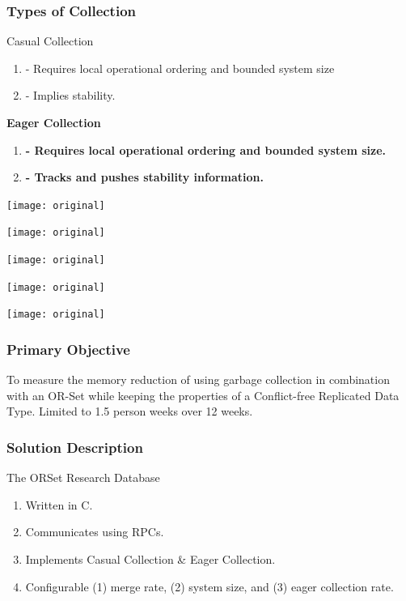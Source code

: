 \documentclass{beamer}
\begin{document}
    \begin{frame}
        \frametitle{Types of Collection}
        Casual Collection
        \begin{enumerate}
            \item - Requires local operational ordering and bounded
                system size
            \item - Implies stability.
        \end{enumerate}

        \textbf{Eager Collection}
        \begin{enumerate}
            \item \textbf{- Requires local operational ordering and bounded
                system size.}
            \item \textbf{- Tracks and pushes stability information.}
        \end{enumerate}
    \end{frame}

    \begin{frame}
        \texttt{[image: original]}
    \end{frame}
    \begin{frame}
        \texttt{[image: original]}
    \end{frame}
    \begin{frame}
        \texttt{[image: original]}
    \end{frame}
    \begin{frame}
        \texttt{[image: original]}
    \end{frame}
    \begin{frame}
        \texttt{[image: original]}
    \end{frame}

    \begin{frame}[shrink]
        \frametitle{Primary Objective}
        \begin{center}
        \begin{minipage}{4in}
         To measure the memory reduction of using garbage collection in
         combination with an OR-Set while keeping the properties of a
         Conflict-free Replicated Data Type. Limited to 1.5 person
         weeks over 12 weeks.
        \end{minipage}
        \end{center}
    \end{frame}

    \begin{frame}
        \frametitle{Solution Description}
        The ORSet Research Database

        \begin{enumerate}
        \item Written in C.
        \item Communicates using RPCs.
        \item Implements Casual Collection \& Eager Collection.
        \item Configurable (1) merge rate, (2) system size, and (3) eager
            collection rate.
        \end{enumerate}
    \end{frame}
\end{document}
